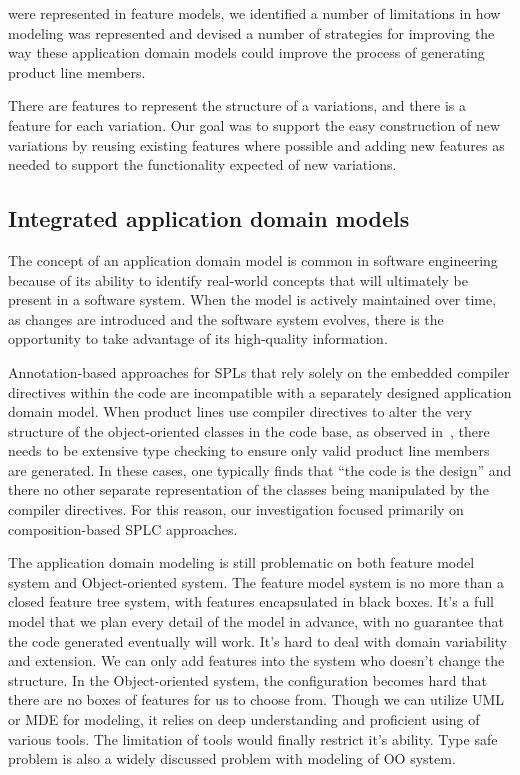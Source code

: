 were represented in feature models, we identified a number of
limitations in how modeling was represented and devised a number of
strategies for improving the way these application domain models could
improve the process of generating product line members.

There are features to represent the structure of a variations, and there
is a feature for each variation. Our goal was to support the easy
construction of new variations by reusing existing features where
possible and adding new features as needed to support the functionality
expected of new variations.

\subsection{Integrated application domain models}

The concept of an application domain model is common in software
engineering because of its ability to identify real-world concepts that
will ultimately be present in a software system. When the model is
actively maintained over time, as changes are introduced and the
software system evolves, there is the opportunity to take advantage of
its high-quality information.

Annotation-based approaches for SPLs that rely solely on the embedded
compiler directives within the code are incompatible with a separately
designed application domain model. When product lines use compiler
directives to alter the very structure of the object-oriented classes in
the code base, as observed in~\cite{Kastner:2012}, there needs to be
extensive type checking to ensure only valid product line members are
generated. In these cases, one typically finds that ``the code is the
design'' and there no other separate representation of the classes being
manipulated by the compiler directives. For this reason, our
investigation focused primarily on composition-based SPLC approaches.

The application domain modeling is still problematic on both feature model
system and Object-oriented system. The feature model system is no more than
a closed feature tree system, with features encapsulated in black boxes. It's a
full model that we plan every detail of the model in advance, with no guarantee that the
code generated eventually will work. It's hard to deal with domain variability and extension.
We can only add features into the system who doesn't change the structure.
In the Object-oriented system, the configuration becomes
 hard that there are no boxes of features for us to choose from. Though
we can utilize UML or MDE for modeling, it relies on deep understanding and proficient using of various
tools. The limitation of tools would finally restrict it's ability.
Type safe problem is also a widely discussed problem with modeling of OO system.

